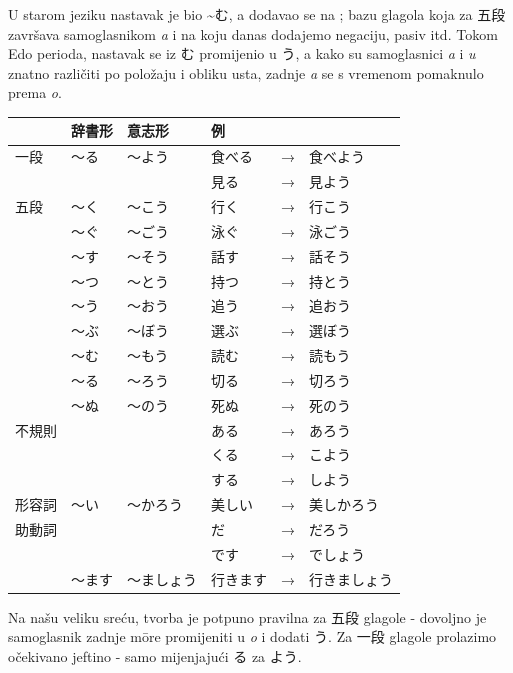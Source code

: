 	
	U starom jeziku nastavak je bio \textasciitilde む, a dodavao se na ; bazu glagola koja za 五段 završava samoglasnikom \textit{a} i na koju danas dodajemo negaciju, pasiv itd. Tokom Edo perioda, nastavak se iz む promijenio u う, a kako su samoglasnici \textit{a} i \textit{u} znatno različiti po položaju i obliku usta, zadnje \textit{a} se s vremenom pomaknulo prema \textit{o}.
	
	\begin{table}[h]
		\centering
		\begin{tabular}{llllll}
			\toprule[2pt]
			& 辞書形 & 意志形 & 例 & & \\
			\midrule
			一段 & 〜る & 〜よう & 食べる&→&食べよう \\
			& & & 見る&→&見よう \\
			\midrule
			五段 & 〜く & 〜こう & 行く&→&行こう\\
			& 〜ぐ & 〜ごう & 泳ぐ&→&泳ごう\\
			& 〜す & 〜そう & 話す&→&話そう\\
			& 〜つ & 〜とう & 持つ&→&持とう\\
			& 〜う & 〜おう & 追う&→&追おう\\
			& 〜ぶ & 〜ぼう & 選ぶ&→&選ぼう\\
			& 〜む & 〜もう & 読む&→&読もう\\
			& 〜る & 〜ろう & 切る&→&切ろう\\
			& 〜ぬ & 〜のう & 死ぬ&→&死のう\\
			\midrule
			不規則 & & & ある &→& あろう \\
			& & & くる &→& こよう \\
			& & & する &→& しよう \\
			\midrule
			形容詞 & 〜い & 〜かろう & 美しい&→&美しかろう \\
			\midrule
			助動詞 & & & だ &→& だろう \\
			& & & です &→& でしょう \\
			& 〜ます & 〜ましょう & 行きます&→&行きましょう \\
			\bottomrule[2pt]
		\end{tabular}
	\end{table}

	Na našu veliku sreću, tvorba je potpuno pravilna za 五段 glagole - dovoljno je samoglasnik zadnje m\={o}re promijeniti u \textit{o} i dodati う.
	Za 一段 glagole prolazimo očekivano jeftino - samo mijenjajući る za よう.
	
